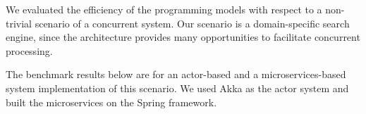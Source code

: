 \documentclass[final,hyperref={pdfpagelabels=true}]{beamer}
\begin{document}
\begin{frame}
\begin{columns}[t]
\begin{column}{.43\textwidth}
{\begin{justify}
        We evaluated the efficiency of the programming models with respect to a non-trivial scenario of a concurrent system. Our scenario is a domain-specific search engine, since the architecture provides many opportunities to facilitate concurrent processing. 

        \vspace*{.85\baselineskip}
        
        The benchmark results below are for an actor-based and a microservices-based system implementation of this scenario. We used Akka as the actor system and built the microservices on the Spring framework.
        \end{justify}
      }

      \renewcommand\sfdefault{lmss} %
      

\end{column}
\end{columns}
\end{frame}
\end{document}
